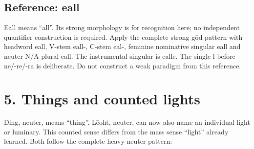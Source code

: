 \subsection*{Reference: eall}

Eall means “all”. Its strong morphology is for recognition here; no independent quantifier construction is required. Apply the complete strong gōd pattern with headword eall, V-stem eall-, C-stem eal-, feminine nominative singular eall and neuter N/\allowbreak{}A plural eall. The instrumental singular is ealle. The single l before -ne/\allowbreak{}-re/\allowbreak{}-ra is deliberate. Do not construct a weak paradigm from this reference.

\section*{5. Things and counted lights}

Ðing, neuter, means “thing”. Lēoht, neuter, can now also name an individual light or luminary. This counted sense differs from the mass sense “light” already learned. Both follow the complete heavy-neuter pattern:

